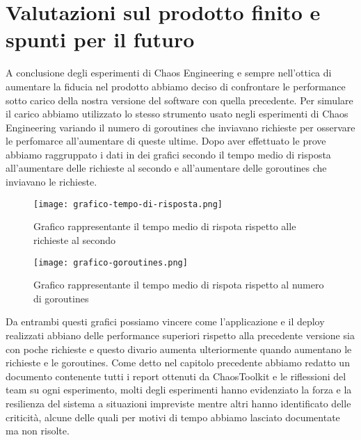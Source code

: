 \section{Valutazioni sul prodotto finito e spunti per il futuro}
A conclusione degli esperimenti di Chaos Engineering e sempre nell'ottica di aumentare la fiducia nel prodotto abbiamo deciso di confrontare le performance sotto carico della nostra versione del software con quella precedente.
Per simulare il carico abbiamo utilizzato lo stesso strumento usato negli esperimenti di Chaos Engineering variando il numero di goroutines che inviavano richieste per osservare le perfomarce all'aumentare di queste ultime.
Dopo aver effettuato le prove abbiamo raggruppato i dati in dei grafici secondo il tempo medio di risposta all'aumentare delle richieste al secondo e all'aumentare delle goroutines che inviavano le richieste.
\begin{figure}[]
    \centering
    \texttt{[image: grafico-tempo-di-risposta.png]}
    \caption{Grafico rappresentante il tempo medio di rispota rispetto alle richieste al secondo}
    \label{tab:graph-req-sec}
\end{figure}
\begin{figure}[]
    \centering
    \texttt{[image: grafico-goroutines.png]}
    \caption{Grafico rappresentante il tempo medio di rispota rispetto al numero di goroutines}
    \label{tab:graph-goroutines}
\end{figure}
Da entrambi questi grafici possiamo vincere come l'applicazione e il deploy realizzati abbiano delle performance superiori rispetto alla precedente versione sia con poche richieste e questo divario aumenta ulteriormente quando aumentano le richieste e le goroutines.
Come detto nel capitolo precedente abbiamo redatto un documento contenente tutti i report ottenuti da ChaosToolkit e le riflessioni del team su ogni esperimento, molti degli esperimenti hanno evidenziato la forza e la resilienza del sistema a situazioni impreviste mentre altri hanno identificato delle criticità, alcune delle quali per motivi di tempo abbiamo lasciato documentate ma non risolte.
